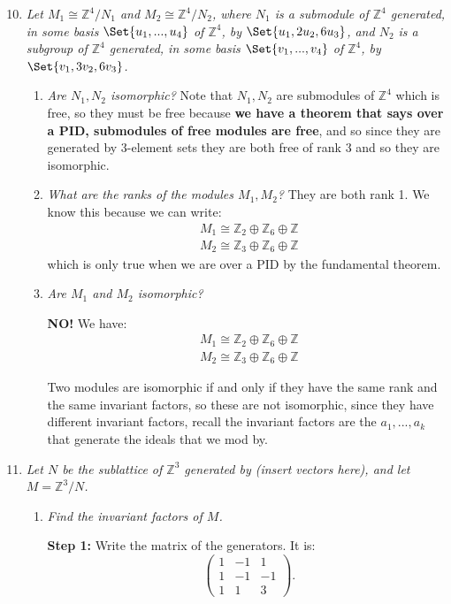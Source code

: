 \documentclass[9pt,reqno,twoside]{amsbook}
\theoremstyle{plain}
\numberwithin{section}{chapter}
\numberwithin{equation}{chapter}
\theoremstyle{definition}
\theoremstyle{remark}
\theoremstyle{plain}
\newcommand{\z}{\mathbb{Z}}
\newcommand{\bee}{\begin{equation}\begin{aligned}}
\newcommand{\eee}{\end{aligned}\end{equation}}
\newcommand{\lpar}{\left(}
\newcommand{\rpar}{\right)}
\begin{document}
\begin{enumerate}[label=\arabic*.]
\setcounter{enumi}{9}

\item \textit{Let $M_1 \cong \z^4/N_1$ and $M_2 \cong \z^4/N_2$, where $N_1$ is a submodule of $\z^4$ generated, in some basis $\Set{u_1,...,u_4}$ of $\z^4$, by $\Set{u_1,2u_2,6u_3}$, and $N_2$ is a subgroup of $\z^4$ generated, in some basis $\Set{v_1,...,v_4}$ of $\z^4$, by $\Set{v_1,3v_2,6v_3}$. }

\begin{enumerate}
\item \textit{Are $N_1,N_2$ isomorphic?}
Note that $N_1,N_2$ are submodules of $\z^4$ which is free, so they must be free because \textbf{we have a theorem that says over a PID, submodules of free modules are free}, and so since they are generated by 3-element sets they are both free of rank 3 and so they are isomorphic. 

\item \textit{What are the ranks of the modules $M_1,M_2$?}
They are both rank 1. We know this because we can write:
\bee
M_1 \cong \z_2 \oplus \z_6 \oplus \z\\
M_2 \cong \z_3 \oplus \z_6 \oplus \z
\eee
which is only true when we are over a PID by the fundamental theorem. 

\item \textit{Are $M_1$ and $M_2$ isomorphic?}


\textbf{NO!}
We have:
\bee
M_1 \cong \z_2 \oplus \z_6 \oplus \z\\
M_2 \cong \z_3 \oplus \z_6 \oplus \z
\eee

Two modules are isomorphic if and only if they have the same rank and the same invariant factors, so these are not isomorphic, since they have different invariant factors, recall the invariant factors are the $a_1,...,a_k$ that generate the ideals that we mod by. 
\end{enumerate}

\item \textit{Let $N$ be the sublattice of $\z^3$ generated by (insert vectors here), and let $M = \z^3/N$. }

\begin{enumerate}

\item \textit{Find the invariant factors of $M$. }

\textbf{Step 1: } Write the matrix of the generators. It is:
$$
\lpar 
\begin{matrix}
1 & -1 & 1\\
1 & -1 & -1\\
1 & 1 & 3
\end{matrix} \rpar.
$$


\end{enumerate}
\end{enumerate}
\end{document}
